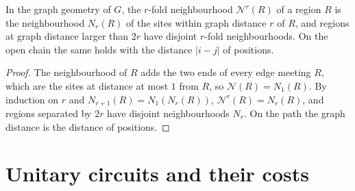 \begin{lemma}
    \label{lem:unitary_graph_light_cone}
    \leanok
    In the graph geometry of $G$, the $r$-fold neighbourhood $\mathcal N^r(R)$ of a
    region $R$ is the neighbourhood $N_r(R)$ of the sites within graph distance $r$ of
    $R$, and regions at graph distance larger than $2r$ have disjoint $r$-fold
    neighbourhoods. On the open chain the same holds with the distance $|i-j|$ of
    positions.
\end{lemma}
\begin{proof}\leanok
    The neighbourhood of $R$ adds the two ends of every edge meeting $R$, which are
    the sites at distance at most $1$ from $R$, so $\mathcal N(R)=N_1(R)$. By
    induction on $r$ and $N_{r+1}(R)=N_1(N_r(R))$, $\mathcal N^r(R)=N_r(R)$, and
    regions separated by $2r$ have disjoint neighbourhoods $N_r$. On the path the
    graph distance is the distance of positions.
\end{proof}

\section{Unitary circuits and their costs}
\label{sec:unitary_circuits}

